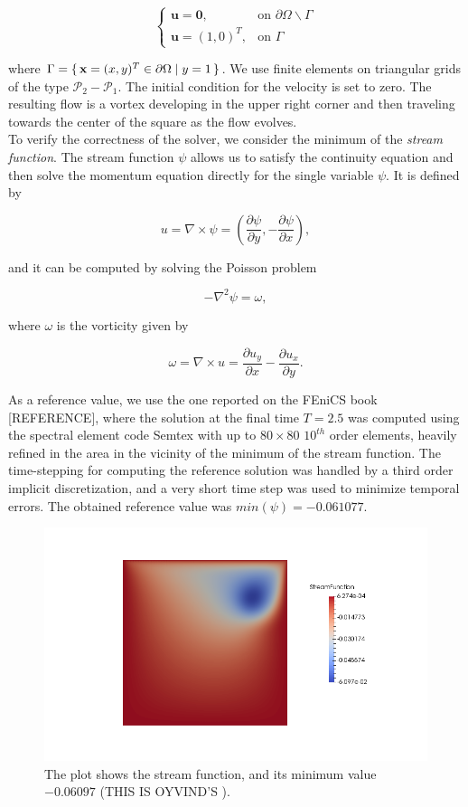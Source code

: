 \documentclass[11pt,a4paper,titlepage]{report}
\begin{document}
\[
\begin{cases}
\mathbf{u = 0}, & \mbox{on } \partial \Omega \backslash \Gamma \\
\mathbf{u} = (1,0)^T, & \mbox{on } \Gamma
\end{cases}
\]

where $ \Gamma = \set{ \mathbf{x} = (x,y)^T \in \partial \Omega | y = 1}$. We use finite elements on triangular grids of the type $\mathcal{P}_2-\mathcal{P}_1$. The initial condition for the velocity is set to zero. The resulting flow is a vortex developing in the upper right corner and then traveling towards the center of the square as the flow evolves. \\
To verify the correctness of the solver, we consider the minimum of the \textit{stream function}. The stream function $\psi$ allows us to satisfy the continuity equation and then solve the momentum equation directly for the single variable $\psi$. It is defined by

\[
u = \nabla \times \psi = (\frac{\partial \psi}{\partial y} , - \frac{\partial \psi }{\partial x}),
\]

and it can be computed by solving the Poisson problem

\[
- \nabla^2 \psi = \omega,
\]

where $\omega$ is the vorticity given by

\[
\omega = \nabla \times u = \frac{\partial u_y}{\partial x} - \frac{\partial u_x}{\partial y}.
\]


As a reference value, we use the one reported on the FEniCS book [REFERENCE], where the solution at the final time $T = 2.5$ was computed using the spectral element code Semtex with up to $80 \times 80$ $10^{th}$ order elements, heavily refined in the area in the vicinity of the minimum of the stream function. The time-stepping for computing the reference solution was handled by a third order implicit discretization, and a very short time step was used to minimize temporal errors.  The obtained reference value was $min(\psi) = -0.061 077$. 

\begin{figure}[ht]
\centering
\includegraphics[width=\textwidth]{images/oyvind.png}
\vspace{-1cm}
\caption{The plot shows the stream function, and its minimum value $-0.06097$ (THIS IS OYVIND'S ).}
\end{figure}
\end{document}
